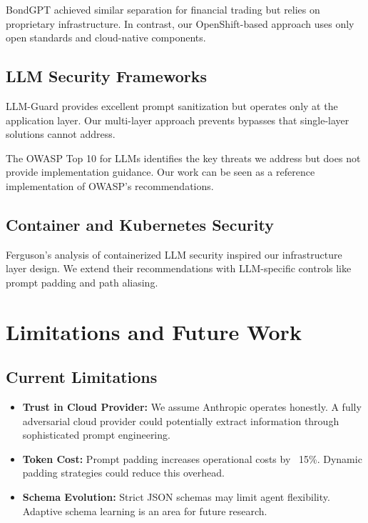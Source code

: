 \documentclass[11pt]{article}
\begin{document}
BondGPT \cite{broadridge2025} achieved similar separation for financial trading but relies on proprietary infrastructure. In contrast, our OpenShift-based approach uses only open standards and cloud-native components.

\subsection{LLM Security Frameworks}

LLM-Guard \cite{llmguard2024} provides excellent prompt sanitization but operates only at the application layer. Our multi-layer approach prevents bypasses that single-layer solutions cannot address.

The OWASP Top 10 for LLMs \cite{owasp2024} identifies the key threats we address but does not provide implementation guidance. Our work can be seen as a reference implementation of OWASP's recommendations.

\subsection{Container and Kubernetes Security}

Ferguson's analysis \cite{ferguson2025} of containerized LLM security inspired our infrastructure layer design. We extend their recommendations with LLM-specific controls like prompt padding and path aliasing.

\section{Limitations and Future Work}

\subsection{Current Limitations}

\begin{itemize}
\item \textbf{Trust in Cloud Provider:} We assume Anthropic operates honestly. A fully adversarial cloud provider could potentially extract information through sophisticated prompt engineering.
\item \textbf{Token Cost:} Prompt padding increases operational costs by ~15\%. Dynamic padding strategies could reduce this overhead.
\item \textbf{Schema Evolution:} Strict JSON schemas may limit agent flexibility. Adaptive schema learning is an area for future research.
\end{itemize}
\end{document}
